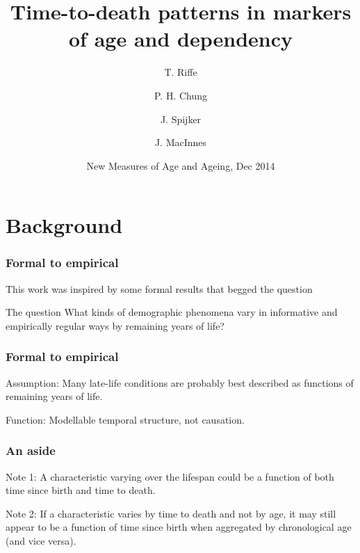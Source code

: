 \documentclass{beamer}
\title[TTD markers]{Time-to-death patterns in markers of age and dependency}
\author[Riffe et. al.]
{
T. Riffe \inst{1} \and P. H. Chung \inst{1} \and J. Spijker \inst{2} \and J.
MacInnes \inst{3} }
\institute[VFU] %
{
  \inst{1}%
  Department of Demography\\
  University of California, Berkeley
  \and
  \inst{2}%
  Wittgenstein Centre (IIASA, VID/\"OAW, WU), Vienna Institute of
  Demography/Austrian Academy of Sciences
  \and
  \inst{3}
  School of Social and Political Science\\
  University of Edinburgh
}
\date[Dec 2014] %
{New Measures of Age and Ageing, Dec 2014}
\begin{document}
\begin{frame}
\titlepage %
\end{frame}

\section{Background} %

\begin{frame}
\frametitle{Formal to empirical}
This work was inspired by some formal results that begged the question
\begin{block}{The question}
What kinds of demographic phenomena vary in informative and empirically regular
ways by remaining years of life?
\end{block}
\end{frame}


\begin{frame}
\frametitle{Formal to empirical}
\begin{block}{Assumption:}
Many late-life conditions are probably best described as
functions of remaining years of life.
\end{block}
\vspace{1em}
\begin{block}{Function:}
Modellable temporal structure, not causation.
\end{block}
\end{frame}


\begin{frame}
\frametitle{An aside}
\begin{block}{Note 1:}
A characteristic varying over the lifespan could be a function of both time
since birth and time to death.
\end{block}
\begin{block}{Note 2:}
If a characteristic varies by time to death and not by age, it may still appear
to be a function of time since birth when aggregated by chronological
age (and vice versa).
\end{block}
\end{frame}

\end{document}
